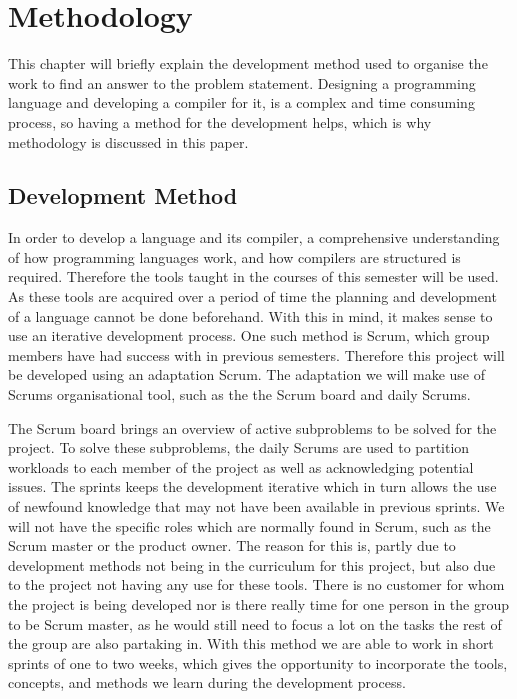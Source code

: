 \chapter{Methodology}\label{chap:methdology}

This chapter will briefly explain the development method used to organise the work to find an answer to the problem statement. 
Designing a programming language and developing a compiler for it, is a complex and time consuming process, so having a method for the development helps, which is why methodology is discussed in this paper.

\section{Development Method}
In order to develop a language and its compiler, a comprehensive understanding of how programming languages work, and how compilers are structured is required.
Therefore the tools taught in the courses of this semester will be used.
As these tools are acquired over a period of time the planning and development of a language cannot be done beforehand.
With this in mind, it makes sense to use an iterative development process.
One such method is Scrum, which group members have had success with in previous semesters.
Therefore this project will be developed using an adaptation Scrum.
The adaptation we will make use of Scrums organisational tool, such as the the Scrum board and daily Scrums.

The Scrum board brings an overview of active subproblems to be solved for the project.
To solve these subproblems, the daily Scrums are used to partition workloads to each member of the project as well as acknowledging potential issues.
The sprints keeps the development iterative which in turn allows the use of newfound knowledge that may not have been available in previous sprints.
We will not have the specific roles which are normally found in Scrum, such as the Scrum master or the product owner. \citep{Scrum}
The reason for this is, partly due to development methods not being in the curriculum for this project, but also due to the project not having any use for these tools.
There is no customer for whom the project is being developed nor is there really time for one person in the group to be Scrum master, as he would still need to focus a lot on the tasks the rest of the group are also partaking in.
With this method we are able to work in short sprints of one to two weeks, which gives the opportunity to incorporate the tools, concepts, and methods we learn during the development process.

